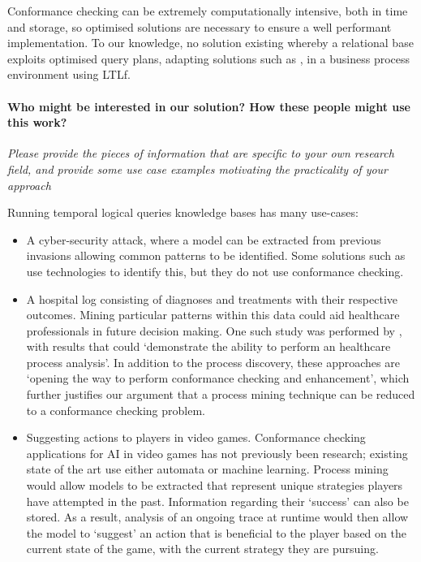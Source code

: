 

Conformance checking can be extremely computationally intensive, both in time and storage, so optimised solutions are necessary to ensure a well performant implementation. To our knowledge, no solution existing whereby a relational base exploits optimised query plans, adapting solutions such as \cite{BellatrecheKB21}, in a business process environment using LTLf.
\medskip

\paragraph*{Who might be interested in our solution? How these people might use this work?} \textit{Please provide the pieces of information that are specific to your own research field, and provide some use case examples motivating the practicality of your approach}  

Running temporal logical queries knowledge bases has many use-cases:
\begin{itemize}
	\item A cyber-security attack, where a model can be extracted from previous invasions allowing common patterns to be identified. Some solutions such as \cite{BENASHER201551} use technologies to identify this, but they do not use conformance checking. 
	\item A hospital log consisting of diagnoses and treatments with their respective outcomes. Mining particular patterns within this data could aid healthcare professionals in future decision making. One such study was performed by \cite{Amantea2020}, with results that could `demonstrate the ability to perform an healthcare process analysis'. In addition to the process discovery, these approaches are `opening the way to perform conformance checking and enhancement', which further justifies our argument that a process mining technique can be reduced to a conformance checking problem.
	\item Suggesting actions to players in video games. Conformance checking applications for AI in video games has not previously been research; existing state of the art \cite{Miyake2017} use either automata or machine learning. Process mining would allow models to be extracted that represent unique strategies players have attempted in the past. Information regarding their `success' can also be stored. As a result, analysis of an ongoing trace at runtime would then allow the model to `suggest' an action that is beneficial to the player based on the current state of the game, with the current strategy they are pursuing.
\end{itemize}

